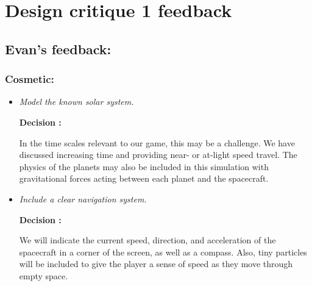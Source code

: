 \section*{Design critique 1 feedback}

\subsection*{Evan's feedback:}
\subsubsection*{Cosmetic:}
\begin{itemize}

  \item \emph{Model the known solar system.}
        
        \textbf{Decision : } \parbox[t]{5in}{In the time scales relevant to our game, this may be a challenge.  We have discussed increasing time and providing near- or at-light speed travel.  The physics of the planets may also be included in this simulation with gravitational forces acting between each planet and the spacecraft.}

  \item \emph{Include a clear navigation system.}
        
        \textbf{Decision : } \parbox[t]{5in}{We will indicate the current speed, direction, and acceleration of the spacecraft in a corner of the screen, as well as a compass.  Also, tiny particles will be included to give the player a sense of speed as they move through empty space.}
\end{itemize}

